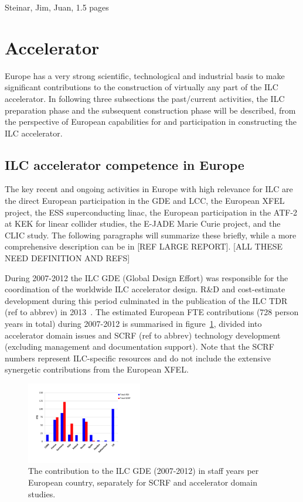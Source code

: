 \documentclass[%
 reprint,
 amsmath,amssymb,
 aps,
]{revtex4-1}
\begin{document}
Steinar, Jim, Juan, 1.5 pages

\section{\label{sec:acc}Accelerator}

Europe has a very strong scientific, technological and industrial basis
to make significant contributions to the construction of virtually any part of the ILC accelerator. 
In following three subsections the past/current activities, the ILC preparation phase and the subsequent construction phase 
will be described, from the perspective of European capabilities for and participation in constructing the ILC accelerator.   

\subsection{ILC accelerator competence in Europe~\label{sec:competence:accelerator}}

The key recent and ongoing activities in Europe with high relevance for ILC are the direct
European participation in the GDE and LCC,
the European XFEL project, the ESS superconducting linac, the European participation
in the ATF-2 at KEK for linear collider studies, the E-JADE Marie Curie project, and the CLIC study. The following paragraphs will summarize these briefly, while a more comprehensive description can be in [REF LARGE REPORT]. [ALL THESE NEED DEFINITION AND REFS]
\vspace{0.15cm}

During 2007-2012 the ILC GDE (Global Design Effort) was responsible for the coordination of the worldwide ILC accelerator design. R\&D and cost-estimate development during this period culminated in the publication of the ILC TDR (ref to abbrev) in 2013~\cite{Behnke:2013xla}. The estimated European FTE contributions (728 person years in total) during 2007-2012 is summarised in figure~\ref{fig:PrePrep:ilcgde4}, 
divided into accelerator domain issues and SCRF (ref to abbrev) technology development (excluding management and documentation support). Note that the SCRF numbers represent ILC-specific resources and do not include the extensive synergetic contributions from the European XFEL.

\begin{figure}[htbp]
\includegraphics[width=0.45\textwidth]{figures/EU-GDE-FTE-columns-per-country.pdf}
\caption{\label{fig:PrePrep:ilcgde4} The contribution to the ILC GDE  (2007-2012) in staff years per European country, separately for SCRF and accelerator domain studies.}
\end{figure}
\end{document}
